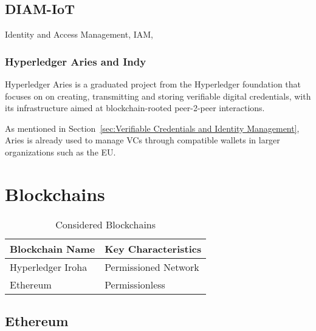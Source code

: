 \subsection{DIAM-IoT} %
\label{sub:DIAM-IoT}
Identity and Access Management, IAM, \cite{DIAM-IoT-Fan_Chai_Xu_Guo_2020}

\subsubsection{Hyperledger Aries and Indy} %
\label{sec:Hyperledger Aries}

Hyperledger Aries is a graduated project from the Hyperledger foundation that focuses on on creating, transmitting and
storing verifiable digital credentials, with its infrastructure aimed at blockchain-rooted peer-2-peer interactions.

As mentioned in Section~\ref{sec:Verifiable Credentials and Identity Management}, Aries is already used to manage VCs
through compatible wallets in larger organizations such as the EU.


\section{Blockchains} %
\label{sec:Blockchains}
\begin{table}
	\caption{Considered Blockchains}
	\label{tab:Considered Blockchains}
	\begin{center}
		\begin{tabular}[c]{|l|l|}
			\hline
			\textbf{Blockchain Name}                  & Key Characteristics  \\
			\hline
			Hyperledger Iroha \cite{hyperledger:wiki} & Permissioned Network \\
			\hline
			Ethereum                                  & Permissionless       \\
			\hline
		\end{tabular}
	\end{center}
\end{table}

\subsection{Ethereum} %
\label{sec:Ethereum}

